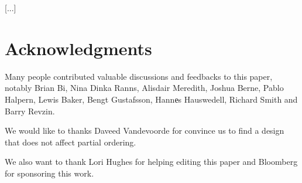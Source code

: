 \documentclass{wg21}
\begin{document}
\textcolor{noteclr}{[...]}


\section{Acknowledgments}
Many people contributed valuable discussions and feedbacks to this paper, notably
Brian Bi, Nina Dinka Ranns, Alisdair Meredith, Joshua Berne, Pablo Halpern, Lewis Baker, Bengt Gustafsson,
Hannеs Hauswedell, Richard Smith and Barry Revzin.

We would like to thanks Daveed Vandevoorde for convince us to find a design that does not affect partial ordering.

We also want to thank Lori Hughes for helping editing this paper and Bloomberg for sponsoring this work.






\renewcommand{\section}[2]{}%

\begin{thebibliography}{9}


\end{thebibliography}
\end{document}
